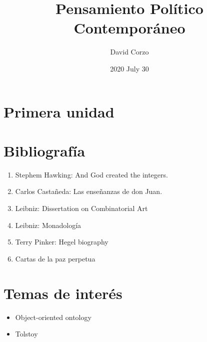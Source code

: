 \documentclass[openany]{book}
\title{Pensamiento Político Contemporáneo}
\date{2020 July 30} %
\author{David Corzo} %
\begin{document}
\maketitle
\tableofcontents

\chapter{Primera unidad}




\chapter{Bibliografía}
\begin{enumerate}
    \item Stephem Hawking: And God created the integers. 
    \item Carlos Castañeda: Las enseñanzas de don Juan.
    \item Leibniz: Dissertation on Combinatorial Art
    \item Leibniz: Monadología
    \item Terry Pinker: Hegel biography
    \item Cartas de la paz perpetua
\end{enumerate}

\chapter{Temas de interés}
\begin{itemize}
    \item Object-oriented ontology
    \item Tolstoy
\end{itemize}

\end{document}
